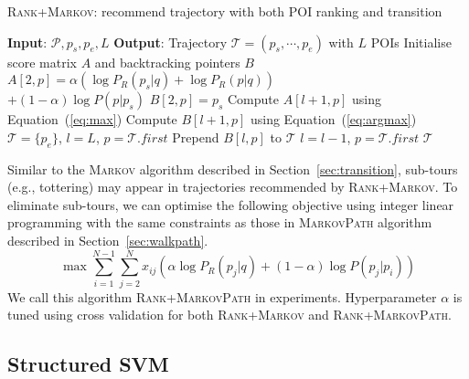 \begin{algorithm}[t]
\caption{\textsc{Rank+Markov}: recommend trajectory with both POI ranking and transition}
\label{alg:rank+markov}
\begin{algorithmic}[1]
\STATE \textbf{Input}: $\mathcal{P}, p_s, p_e, L$
\STATE \textbf{Output}: Trajectory $\mathcal{T} = (p_s, \cdots, p_e)$ with $L$ POIs
\STATE Initialise score matrix $A$ and backtracking pointers $B$
    \STATE $A[2, p] = \alpha ( \log P_R(p_s|q) + \log P_R(p|q) )$ \\ \hfill $+ (1-\alpha) \log P(p|p_s)$
    \STATE $B[2, p] = p_s$
\ENDFOR
{}
        \STATE Compute $A[l+1, p]$ using Equation~(\ref{eq:max})
        \STATE Compute $B[l+1, p]$ using Equation~(\ref{eq:argmax})
    \ENDFOR
\ENDFOR
\STATE $\mathcal{T}= \{p_e\}$, $l = L$, $p = \mathcal{T}.first$
\REPEAT
    \STATE Prepend $B[l, p]$ to $\mathcal{T}$
    \STATE $l = l - 1$, $p = \mathcal{T}.first$
\RETURN $\mathcal{T}$
\end{algorithmic}
\end{algorithm}

Similar to the \textsc{Markov} algorithm described in Section~\ref{sec:transition},
sub-tours (e.g., tottering) may appear in trajectories recommended by \textsc{Rank+Markov}.
To eliminate sub-tours, we can optimise the following objective using integer linear programming
with the same constraints as those in \textsc{MarkovPath} algorithm described in Section~\ref{sec:walkpath}.
\begin{displaymath}
    \max  \sum_{i=1}^{N-1} \sum_{j=2}^N x_{ij} (\alpha \log P_R(p_j | q) + (1-\alpha) \log P(p_j | p_i))
\end{displaymath}
We call this algorithm \textsc{Rank+MarkovPath} in experiments.
Hyperparameter $\alpha$ is tuned using cross validation for both \textsc{Rank+Markov} and \textsc{Rank+MarkovPath}. 

\subsection{Structured SVM}
\label{sec:ssvm}
\secmoveup

